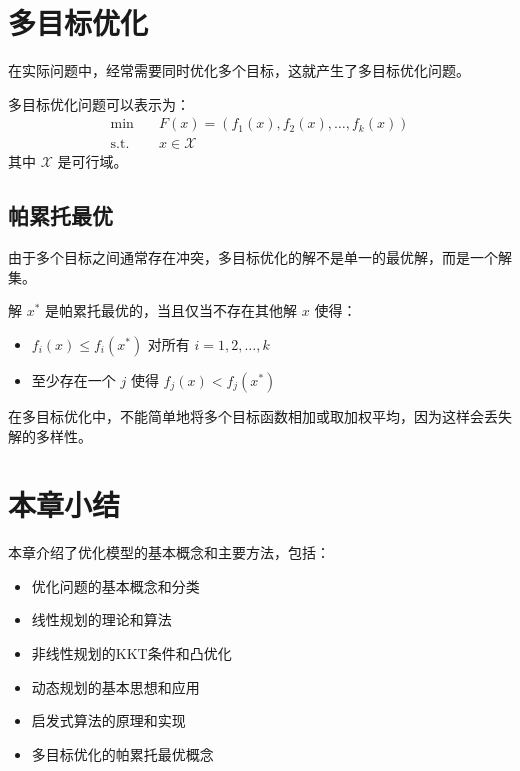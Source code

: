 \section{多目标优化}\label{sec:multi-objective-optimization}

在实际问题中，经常需要同时优化多个目标，这就产生了多目标优化问题。

\begin{definition}[多目标优化问题]\label{def:multi-objective}
多目标优化问题可以表示为：
\begin{align}
\min \quad & F(x) = (f_1(x), f_2(x), \ldots, f_k(x)) \\
\text{s.t.} \quad & x \in \mathcal{X}
\end{align}
其中 $\mathcal{X}$ 是可行域。
\end{definition}

\subsection{帕累托最优}

由于多个目标之间通常存在冲突，多目标优化的解不是单一的最优解，而是一个解集。

\begin{definition}[帕累托最优]\label{def:pareto-optimal}
解 $x^*$ 是帕累托最优的，当且仅当不存在其他解 $x$ 使得：
\begin{itemize}
    \item $f_i(x) \leq f_i(x^*)$ 对所有 $i = 1, 2, \ldots, k$
    \item 至少存在一个 $j$ 使得 $f_j(x) < f_j(x^*)$
\end{itemize}
\end{definition}

\begin{errorbox}[title=常见误区]
在多目标优化中，不能简单地将多个目标函数相加或取加权平均，因为这样会丢失解的多样性。
\end{errorbox}

\section{本章小结}\label{sec:chapter2-summary}

本章介绍了优化模型的基本概念和主要方法，包括：

\begin{itemize}
    \item 优化问题的基本概念和分类
    \item 线性规划的理论和算法
    \item 非线性规划的KKT条件和凸优化
    \item 动态规划的基本思想和应用
    \item 启发式算法的原理和实现
    \item 多目标优化的帕累托最优概念
\end{itemize}


